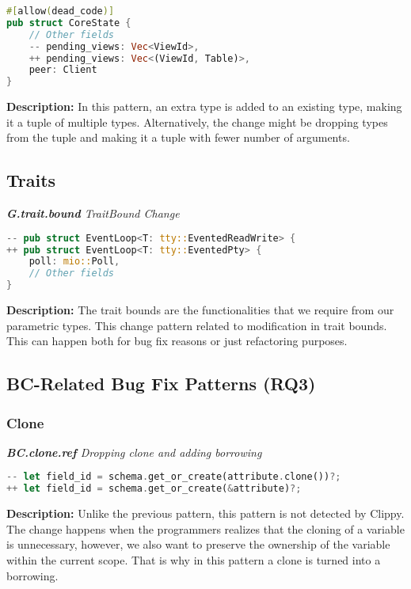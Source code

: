 \begin{lstlisting}[language=Rust, style=colouredRust, label={l3}]
#[allow(dead_code)]
pub struct CoreState {
    // Other fields
    -- pending_views: Vec<ViewId>,
    ++ pending_views: Vec<(ViewId, Table)>,
    peer: Client
}
\end{lstlisting}



\noindent \textbf{Description:} In this pattern, an extra type is added to an existing type, making it a tuple of multiple types. Alternatively, the change might be dropping types from the tuple and making it a tuple with fewer number of arguments.

\subsection{Traits}
\noindent \textit{ \textbf{G.trait.bound} TraitBound Change}

\begin{lstlisting}[language=Rust, style=colouredRust, label={l3}]
-- pub struct EventLoop<T: tty::EventedReadWrite> {
++ pub struct EventLoop<T: tty::EventedPty> {
    poll: mio::Poll,
    // Other fields
}

\end{lstlisting}

\noindent \textbf{Description:} The trait bounds are the functionalities that we require from our parametric types. This change pattern related to modification in trait bounds. This can happen both for bug fix reasons or just refactoring purposes.

\subsection{BC-Related Bug Fix Patterns (RQ3)}

\subsubsection{Clone}

\noindent \textit{ \textbf{BC.clone.ref} Dropping clone and adding borrowing}

\begin{lstlisting}[language=Rust, style=colouredRust, label={l3}]
-- let field_id = schema.get_or_create(attribute.clone())?;
++ let field_id = schema.get_or_create(&attribute)?;
\end{lstlisting}

\noindent \textbf{Description:} Unlike the previous pattern, this pattern is not detected by Clippy. The change happens when the programmers realizes that the cloning of a variable is unnecessary, however, we also want to preserve the ownership of the variable within the current scope. That is why in this pattern a clone is turned into a borrowing. 

